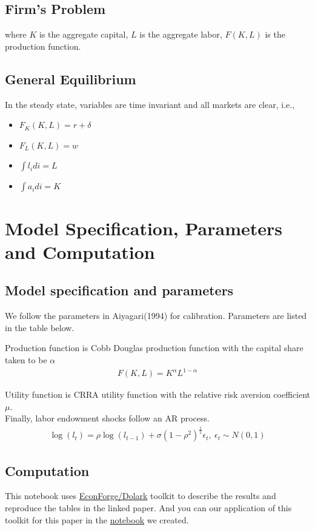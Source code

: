 \documentclass[]{article}
\providecommand{\EqDir}{Equations}
\begin{document}
\subsection{Firm's Problem}

where $K$ is the aggregate capital, $L$ is the aggregate labor, $F(K,L)$ is the production function.

\subsection{General Equilibrium}
In the steady state, variables are time invariant and all markets are clear, i.e.,
\begin{itemize}
	\item $F_K(K,L) = r+\delta$ 
	\item $F_L(K,L) = w$
	\item $\int l_i di = L$
	\item $\int a_i di = K$	
\end{itemize}


\section{Model Specification, Parameters and Computation}
\subsection{Model specification and parameters}
We follow the parameters in Aiyagari(1994) for calibration. Parameters are listed in the table below. 


Production function is Cobb Douglas production function with the capital share taken to be $\alpha$
\begin{align}
	F(K,L) = K^\alpha L^{1-\alpha}
\end{align}

Utility function is CRRA utility function with the relative risk aversion coefficient $\mu$.\\

Finally, labor endowment shocks follow an AR process.
\begin{align}
\log(l_t)=\rho\log(l_{t-1})+\sigma(1-\rho^2)^{\frac{1}{2}}\epsilon_{t}, \ \epsilon_t \sim N(0,1)   
\end{align}



\subsection{Computation}
This notebook uses \href{http://www.econforge.org/dolark/}{EconForge/Dolark} toolkit to describe the results and reproduce the tables in the linked paper. And you can our application of this toolkit for this paper in the \href{run:../Aiyagari1994QJE.ipynb}{notebook} we created.
\end{document}
